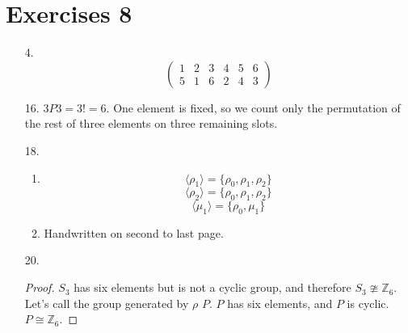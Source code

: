 \documentclass{article}
\begin{document}
\section*{Exercises 8}
\begin{itemize}
\item [4.]
  \[\begin{pmatrix}
    1 & 2 & 3 & 4 & 5 & 6\\
    5 & 1 & 6 & 2 & 4 & 3
  \end{pmatrix}\]
\item [16.]
  $3P3 = 3! = 6$. One element is fixed, so we count only the permutation of the rest of three elements on three remaining slots.
\item [18.]
  \begin{enumerate}[label=\alph*.]
  \item
    \[\langle \rho_1 \rangle = \{\rho_0, \rho_1, \rho_2\}\]
    \[\langle \rho_2 \rangle = \{\rho_0, \rho_1, \rho_2\}\]
    \[\langle \mu_1 \rangle = \{\rho_0, \mu_1\}\]
  \item Handwritten on second to last page.
  \end{enumerate}
\item [20.]
  \begin{proof}
    $S_3$ has six elements but is not a cyclic group, and therefore
    $S_3 \ncong \mathbb{Z}_6$. Let's call the group generated by
    $\rho$ $P$. $P$ has six elements, and $P$ is cyclic.
    $P \cong \mathbb{Z}_6$.


\end{proof}
\end{itemize}
\end{document}
